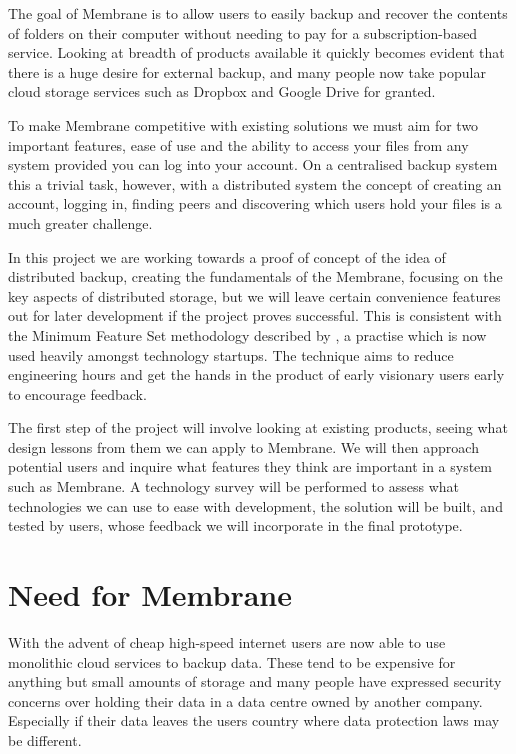 \documentclass[11pt, a4paper, twocolumn, twoside]{report}
\begin{document}
The goal of Membrane is to allow users to easily backup and recover the contents of folders on their computer without needing to pay for a subscription-based service. Looking at breadth of products available it quickly becomes evident that there is a huge desire for external backup, and many people now take popular cloud storage services such as Dropbox and Google Drive for granted. \citep{dropbox2015popularity}

To make Membrane competitive with existing solutions we must aim for two important features, ease of use and the ability to access your files from any system provided you can log into your account. On a centralised backup system this a trivial task, however, with a distributed system the concept of creating an account, logging in, finding peers and discovering which users hold your files is a much greater challenge.

In this project we are working towards a proof of concept of the idea of distributed backup, creating the fundamentals of the Membrane, focusing on the key aspects of distributed storage, but we will leave certain convenience features out for later development if the project proves successful. This is consistent with the Minimum Feature Set methodology described by \cite{blank2010mfs}, a practise which is now used heavily amongst technology startups. The technique aims to reduce engineering hours and get the hands in the product of early visionary users early to encourage feedback.

The first step of the project will involve looking at existing products, seeing what design lessons from them we can apply to Membrane. We will then approach potential users and inquire what features they think are important in a system such as Membrane. A technology survey will be performed to assess what technologies we can use to ease with development, the solution will be built, and tested by users, whose feedback we will incorporate in the final prototype.

\section{Need for Membrane}

With the advent of cheap high-speed internet users are now able to use monolithic cloud services to backup data. These tend to be expensive for anything but small amounts of storage and many people have expressed security concerns over holding their data in a data centre owned by another company. \citep{batters2010dbsecurity} Especially if their data leaves the users country where data protection laws may be different.
\end{document}
